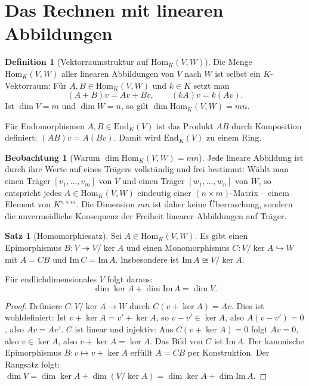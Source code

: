 ﻿\documentclass[a4paper,12pt]{report}
\theoremstyle{definition}
\newtheorem{definition}{Definition}
\newtheorem{satz}{Satz}
\newtheorem{beobachtung}{Beobachtung}
\begin{document}
\section{Das Rechnen mit linearen Abbildungen}

\begin{definition}[Vektorraumstruktur auf \texorpdfstring{$\mathrm{Hom}_K(V,W)$}{Hom_K(V,W)}]
    Die Menge $\mathrm{Hom}_K(V, W)$ aller linearen Abbildungen von $V$
    nach $W$ ist selbst ein $K$-Vektorraum: Für $A, B \in \mathrm{Hom}_K(V,W)$
    und $k \in K$ setzt man
    \[
        (A + B)v = Av + Bv, \qquad (kA)v = k(Av).
    \]
    Ist $\dim V = m$ und $\dim W = n$, so gilt
    $\dim \mathrm{Hom}_K(V, W) = mn$.

    Für Endomorphismen $A, B \in \mathrm{End}_K(V)$ ist das Produkt
    $AB$ durch Komposition definiert: $(AB)v = A(Bv)$. Damit wird
    $\mathrm{End}_K(V)$ zu einem Ring.
\end{definition}

\begin{beobachtung}[Warum \texorpdfstring{$\dim \mathrm{Hom}_K(V,W) = mn$}{ Hom_K(V,W) = mn}]
    Jede lineare Abbildung ist durch ihre Werte auf eines Trägers vollständig
    und frei bestimmt: Wählt man einen Träger $[v_1, \dots, v_m]$ von $V$
    und einen Träger $[w_1, \dots, w_n]$ von $W$, so entspricht jedes
    $A \in \mathrm{Hom}_K(V,W)$ eindeutig einer $(n \times m)$-Matrix --
    einem Element von $K^{n \times m}$. Die Dimension $mn$ ist daher
    keine Überraschung, sondern die unvermeidliche Konsequenz der Freiheit
    linearer Abbildungen auf Träger.
\end{beobachtung}

\begin{satz}[Homomorphiesatz]
    Sei $A \in \mathrm{Hom}_K(V, W)$. Es gibt einen Epimorphismus
    $B : V \twoheadrightarrow V/\ker A$ und einen Monomorphismus
    $C : V/\ker A \hookrightarrow W$ mit $A = CB$ und
    $\mathrm{Im}\, C = \mathrm{Im}\, A$. Insbesondere ist
    $\mathrm{Im}\, A \cong V / \ker A$.

    Für endlichdimensionales $V$ folgt daraus:
    \[
        \dim \ker A + \dim \mathrm{Im}\, A = \dim V.
    \]
\end{satz}
\begin{proof}
    Definiere $C : V/\ker A \to W$ durch $C(v + \ker A) = Av$.
    Dies ist wohldefiniert: Ist $v + \ker A = v' + \ker A$, so $v - v' \in \ker A$,
    also $A(v - v') = 0$, also $Av = Av'$.
    $C$ ist linear und injektiv: Aus $C(v + \ker A) = 0$ folgt $Av = 0$,
    also $v \in \ker A$, also $v + \ker A = \ker A$. Das Bild von $C$
    ist $\mathrm{Im}\, A$. Der kanonische Epimorphismus $B : v \mapsto v + \ker A$
    erfüllt $A = CB$ per Konstruktion.
    Der Rangsatz folgt: $\dim V = \dim \ker A + \dim(V/\ker A) = \dim \ker A + \dim \mathrm{Im}\, A$.
\end{proof}
\end{document}
